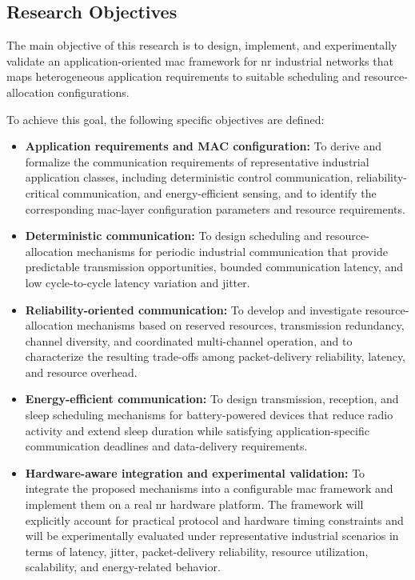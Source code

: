 \documentclass[12pt,a4paper]{article}
\begin{document}

\subsection{Research Objectives}
\label{subsec:research_objectives}

The main objective of this research is to design, implement, and experimentally
validate an application-oriented \gls{mac} framework for \gls{nr} industrial
networks that maps heterogeneous application requirements to suitable scheduling
and resource-allocation configurations.

To achieve this goal, the following specific objectives are defined:

\begin{itemize}

\item \textbf{Application requirements and MAC configuration:}
To derive and formalize the communication requirements of representative
industrial application classes, including deterministic control communication,
reliability-critical communication, and energy-efficient sensing, and to
identify the corresponding \gls{mac}-layer configuration parameters and
resource requirements.

\item \textbf{Deterministic communication:}
To design scheduling and resource-allocation mechanisms for periodic industrial
communication that provide predictable transmission opportunities, bounded
communication latency, and low cycle-to-cycle latency variation and jitter.

\item \textbf{Reliability-oriented communication:}
To develop and investigate resource-allocation mechanisms based on reserved
resources, transmission redundancy, channel diversity, and coordinated
multi-channel operation, and to characterize the resulting trade-offs among
packet-delivery reliability, latency, and resource overhead.

\item \textbf{Energy-efficient communication:}
To design transmission, reception, and sleep scheduling mechanisms for
battery-powered devices that reduce radio activity and extend sleep duration
while satisfying application-specific communication deadlines and
data-delivery requirements.

\item \textbf{Hardware-aware integration and experimental validation:}
To integrate the proposed mechanisms into a configurable \gls{mac} framework
and implement them on a real \gls{nr} hardware platform. The framework will
explicitly account for practical protocol and hardware timing constraints and
will be experimentally evaluated under representative industrial scenarios in
terms of latency, jitter, packet-delivery reliability, resource utilization,
scalability, and energy-related behavior.

\end{itemize}
\end{document}
